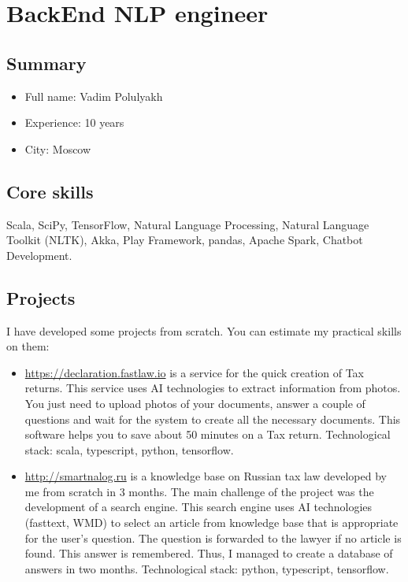 \hypertarget{backend-nlp-engineer}{%
\section{BackEnd NLP engineer}\label{backend-nlp-engineer}}

\hypertarget{summary}{%
\subsection{Summary}\label{summary}}

\begin{itemize}
\tightlist
\item
  Full name: Vadim Polulyakh
\item
  Experience: 10 years
\item
  City: Moscow
\end{itemize}

\hypertarget{core-skills}{%
\subsection{Core skills}\label{core-skills}}

Scala, SciPy, TensorFlow, Natural Language Processing, Natural Language
Toolkit (NLTK), Akka, Play Framework, pandas, Apache Spark, Chatbot
Development.

\hypertarget{projects}{%
\subsection{Projects}\label{projects}}

I have developed some projects from scratch. You can estimate my
practical skills on them:

\begin{itemize}
\tightlist
\item
  \url{https://declaration.fastlaw.io} is a service for the quick
  creation of Tax returns. This service uses AI technologies to extract
  information from photos. You just need to upload photos of your
  documents, answer a couple of questions and wait for the system to
  create all the necessary documents. This software helps you to save
  about 50 minutes on a Tax return. Technological stack: scala,
  typescript, python, tensorflow.
\item
  \href{smartnalog.ru}{http://smartnalog.ru} is a knowledge base on
  Russian tax law developed by me from scratch in 3 months. The main
  challenge of the project was the development of a search engine. This
  search engine uses AI technologies (fasttext, WMD) to select an
  article from knowledge base that is appropriate for the user's
  question. The question is forwarded to the lawyer if no article is
  found. This answer is remembered. Thus, I managed to create a database
  of answers in two months. Technological stack: python, typescript,
  tensorflow.
\end{itemize}


